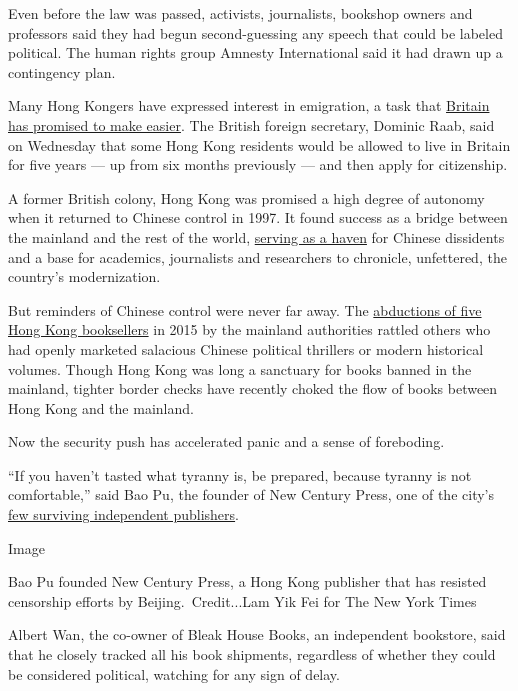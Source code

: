 Even before the law was passed, activists, journalists, bookshop owners
and professors said they had begun second-guessing any speech that could
be labeled political. The human rights group Amnesty International said
it had drawn up a contingency plan.

Many Hong Kongers have expressed interest in emigration, a task that
\href{https://www.nytimes.com/2020/06/03/world/europe/boris-johnson-uk-hong-kong-china.html}{Britain
has promised to make easier}. The British foreign secretary, Dominic
Raab, said on Wednesday that some Hong Kong residents would be allowed
to live in Britain for five years --- up from six months previously ---
and then apply for citizenship.

A former British colony, Hong Kong was promised a high degree of
autonomy when it returned to Chinese control in 1997. It found success
as a bridge between the mainland and the rest of the world,
\href{https://www.nytimes.com/2019/06/18/world/asia/hong-kong-extradition-bill-china.html}{serving
as a haven} for Chinese dissidents and a base for academics, journalists
and researchers to chronicle, unfettered, the country's modernization.

But reminders of Chinese control were never far away. The
\href{https://www.nytimes.com/2018/04/03/magazine/the-case-of-hong-kongs-missing-booksellers.html}{abductions
of five Hong Kong booksellers} in 2015 by the mainland authorities
rattled others who had openly marketed salacious Chinese political
thrillers or modern historical volumes. Though Hong Kong was long a
sanctuary for books banned in the mainland, tighter border checks have
recently choked the flow of books between Hong Kong and the mainland.

Now the security push has accelerated panic and a sense of foreboding.

``If you haven't tasted what tyranny is, be prepared, because tyranny is
not comfortable,'' said Bao Pu, the founder of New Century Press, one of
the city's
\href{https://www.nytimes.com/2019/06/04/books/hong-kong-publishing-tiananmen.html}{few
surviving independent publishers}.

Image

Bao Pu founded New Century Press, a Hong Kong publisher that has
resisted censorship efforts by Beijing.~Credit...Lam Yik Fei for The New
York Times

Albert Wan, the co-owner of Bleak House Books, an independent bookstore,
said that he closely tracked all his book shipments, regardless of
whether they could be considered political, watching for any sign of
delay.

